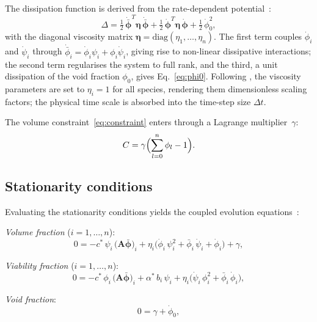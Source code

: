 \documentclass[11pt,a4paper]{article}
\newcommand{\bphi}{\boldsymbol{\phi}}
\begin{document}
The dissipation function is derived from the rate-dependent potential~\citep{Klempt2025ContinuumBiofilm}:
\begin{equation}
\Delta = \tfrac{1}{2}\,\dot{\bar{\bphi}}^T\boldsymbol{\eta}\,\dot{\bar{\bphi}}
          + \tfrac{1}{2}\,\dot{\bphi}^T\boldsymbol{\eta}\,\dot{\bphi}
          + \tfrac{1}{2}\,\dot\phi_0^2,
\label{eq:dissipation}
\end{equation}
with the diagonal viscosity matrix $\boldsymbol{\eta}=\mathrm{diag}(\eta_1,\dots,\eta_n)$. The first term couples $\dot\phi_i$ and $\dot\psi_i$ through $\dot{\bar\phi}_i = \dot\phi_i\psi_i + \phi_i\dot\psi_i$, giving rise to non-linear dissipative interactions; the second term regularises the system to full rank, and the third, a unit dissipation of the void fraction $\phi_0$, gives Eq.~\eqref{eq:phi0}. Following \citet{Klempt2025ContinuumBiofilm}, the viscosity parameters are set to $\eta_i=1$ for all species, rendering them dimensionless scaling factors; the physical time scale is absorbed into the time-step size $\Delta t$.

The volume constraint~\eqref{eq:constraint} enters through a Lagrange multiplier~$\gamma$:
\begin{equation}
C = \gamma\Bigl(\sum_{l=0}^{n}\phi_l - 1\Bigr).
\label{eq:cfunc}
\end{equation}


\subsection*{Stationarity conditions}


Evaluating the stationarity conditions yields the coupled evolution equations~\citep{Klempt2025ContinuumBiofilm}:

\medskip\noindent
\textit{Volume fraction} ($i=1,\dots,n$):
\begin{equation}
0 = -c^*\,\psi_i\,\bigl(\mathbf{A}\bar{\bphi}\bigr)_i
    + \eta_i\bigl(\dot\phi_i\,\psi_i^2 + \bar\phi_i\,\dot\psi_i + \dot\phi_i\bigr)
    + \gamma,
\label{eq:phi}
\end{equation}

\noindent\textit{Viability fraction} ($i=1,\dots,n$):
\begin{equation}
0 = -c^*\,\phi_i\,\bigl(\mathbf{A}\bar{\bphi}\bigr)_i
    + \alpha^*\,b_i\,\psi_i
    + \eta_i\bigl(\dot\psi_i\,\phi_i^2 + \bar\phi_i\,\dot\phi_i\bigr),
\label{eq:psi_evol}
\end{equation}

\noindent\textit{Void fraction}:
\begin{equation}
0 = \gamma + \dot\phi_0,
\label{eq:phi0}
\end{equation}
\end{document}
